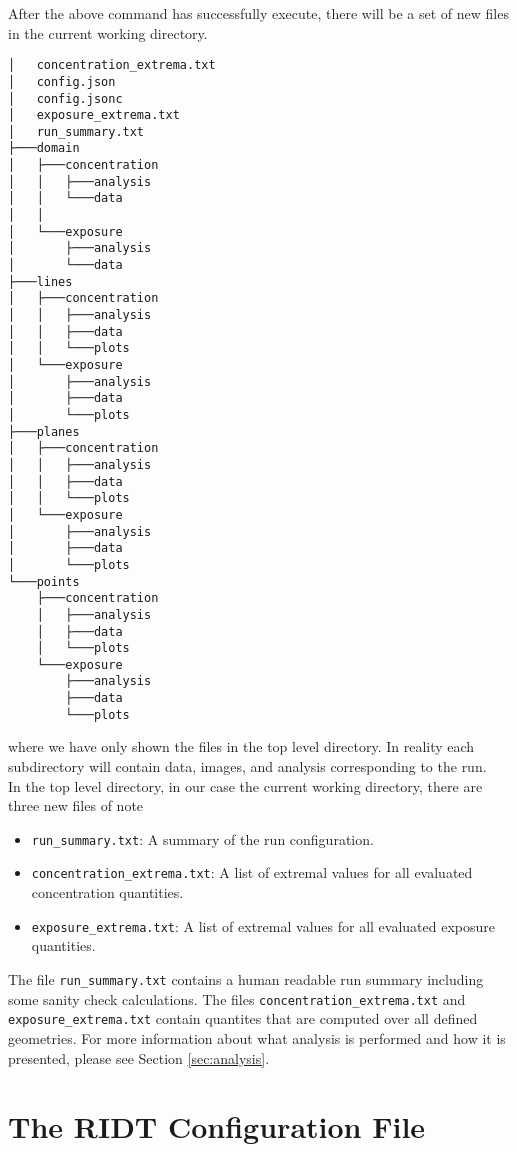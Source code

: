 \documentclass[]{article}
\def\code#1{\texttt{#1}}
\begin{document}
\noindent After the above command has successfully execute, there will be a set
of new files in the current working directory.

\begin{verbatim}
│   concentration_extrema.txt
│   config.json
│   config.jsonc
│   exposure_extrema.txt
│   run_summary.txt
├───domain
│   ├───concentration
│   │   ├───analysis
│   │   └───data
│   │
│   └───exposure
│       ├───analysis
│       └───data
├───lines
│   ├───concentration
│   │   ├───analysis
│   │   ├───data
│   │   └───plots
│   └───exposure
│       ├───analysis
│       ├───data
│       └───plots
├───planes
│   ├───concentration
│   │   ├───analysis
│   │   ├───data
│   │   └───plots
│   └───exposure
│       ├───analysis
│       ├───data
│       └───plots
└───points
    ├───concentration
    │   ├───analysis
    │   ├───data
    │   └───plots
    └───exposure
        ├───analysis
        ├───data
        └───plots
\end{verbatim}

\noindent where we have only shown the files in the top level directory. In
reality each subdirectory will contain data, images, and analysis corresponding
to the run.\\

\noindent In the top level directory, in our case the current working directory,
there are three new files of note
\begin{itemize}
    \item \code{run\_summary.txt}: A summary of the run configuration.
    \item \code{concentration\_extrema.txt}: A list of extremal values for all
    evaluated concentration quantities.
    \item \code{exposure\_extrema.txt}: A list of extremal values for all
    evaluated exposure quantities.
\end{itemize}

\noindent The file \code{run\_summary.txt} contains a human readable run summary
including some sanity check calculations. The files
\code{concentration\_extrema.txt} and \code{exposure\_extrema.txt} contain
quantites that are computed over all defined geometries. For more information
about what analysis is performed and how it is presented, please see Section
\ref{sec:analysis}.

\section{The RIDT Configuration File}\label{sec:configfile}
\end{document}
